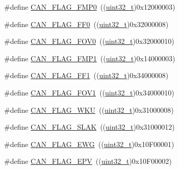 \begin{DoxyCompactItemize}
\item 
\#define \hyperlink{group___c_a_n__flags_ga4b40574700edfe752433bb4e0d457c64}{C\+A\+N\+\_\+\+F\+L\+A\+G\+\_\+\+F\+M\+P0}~((\hyperlink{_p_e___types_8h_a33594304e786b158f3fb30289278f5af}{uint32\+\_\+t})0x12000003)
\item 
\#define \hyperlink{group___c_a_n__flags_ga11648741ff43af1561ce7009698fb797}{C\+A\+N\+\_\+\+F\+L\+A\+G\+\_\+\+F\+F0}~((\hyperlink{_p_e___types_8h_a33594304e786b158f3fb30289278f5af}{uint32\+\_\+t})0x32000008)
\item 
\#define \hyperlink{group___c_a_n__flags_ga2abd66b5e0032132673208decd2d01f2}{C\+A\+N\+\_\+\+F\+L\+A\+G\+\_\+\+F\+O\+V0}~((\hyperlink{_p_e___types_8h_a33594304e786b158f3fb30289278f5af}{uint32\+\_\+t})0x32000010)
\item 
\#define \hyperlink{group___c_a_n__flags_ga5d4b7376954a059fbd74ed8d688f6657}{C\+A\+N\+\_\+\+F\+L\+A\+G\+\_\+\+F\+M\+P1}~((\hyperlink{_p_e___types_8h_a33594304e786b158f3fb30289278f5af}{uint32\+\_\+t})0x14000003)
\item 
\#define \hyperlink{group___c_a_n__flags_ga0fa967743c5db04189bb2160aa48e371}{C\+A\+N\+\_\+\+F\+L\+A\+G\+\_\+\+F\+F1}~((\hyperlink{_p_e___types_8h_a33594304e786b158f3fb30289278f5af}{uint32\+\_\+t})0x34000008)
\item 
\#define \hyperlink{group___c_a_n__flags_gac1af6e61b1285ddc4658c4bcc152719a}{C\+A\+N\+\_\+\+F\+L\+A\+G\+\_\+\+F\+O\+V1}~((\hyperlink{_p_e___types_8h_a33594304e786b158f3fb30289278f5af}{uint32\+\_\+t})0x34000010)
\item 
\#define \hyperlink{group___c_a_n__flags_ga18c72dbe75cb80e8b5126c23c9120818}{C\+A\+N\+\_\+\+F\+L\+A\+G\+\_\+\+W\+KU}~((\hyperlink{_p_e___types_8h_a33594304e786b158f3fb30289278f5af}{uint32\+\_\+t})0x31000008)
\item 
\#define \hyperlink{group___c_a_n__flags_gad087b5025a3d5ead2c32b06663821cf4}{C\+A\+N\+\_\+\+F\+L\+A\+G\+\_\+\+S\+L\+AK}~((\hyperlink{_p_e___types_8h_a33594304e786b158f3fb30289278f5af}{uint32\+\_\+t})0x31000012)
\item 
\#define \hyperlink{group___c_a_n__flags_gae8906ba9c4031866c5096418ffa9bf71}{C\+A\+N\+\_\+\+F\+L\+A\+G\+\_\+\+E\+WG}~((\hyperlink{_p_e___types_8h_a33594304e786b158f3fb30289278f5af}{uint32\+\_\+t})0x10\+F00001)
\item 
\#define \hyperlink{group___c_a_n__flags_ga61954e54995f638ed78281ad2b0cf43a}{C\+A\+N\+\_\+\+F\+L\+A\+G\+\_\+\+E\+PV}~((\hyperlink{_p_e___types_8h_a33594304e786b158f3fb30289278f5af}{uint32\+\_\+t})0x10\+F00002)
\item 

\end{DoxyCompactItemize}
